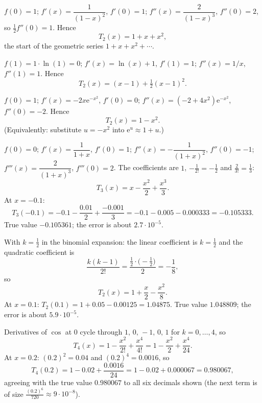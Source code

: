 \begin{solutions}
  \item $f(0)=1$; $f'(x)=\dfrac{1}{(1-x)^{2}}$, $f'(0)=1$;
        $f''(x)=\dfrac{2}{(1-x)^{3}}$, $f''(0)=2$, so
        $\tfrac12 f''(0)=1$. Hence
        \[
          T_{2}(x)=1+x+x^{2} ,
        \]
        the start of the geometric series $1+x+x^{2}+\cdots$.

  \item $f(1)=1\cdot\ln(1)=0$; $f'(x)=\ln(x)+1$, $f'(1)=1$;
        $f''(x)=1/x$, $f''(1)=1$. Hence
        \[
          T_{2}(x)=(x-1)+\tfrac12(x-1)^{2} .
        \]

  \item $f(0)=1$; $f'(x)=-2x\mathrm{e}^{-x^{2}}$, $f'(0)=0$;
        $f''(x)=(-2+4x^{2})\mathrm{e}^{-x^{2}}$, $f''(0)=-2$. Hence
        \[
          T_{2}(x)=1-x^{2} .
        \]
        (Equivalently: substitute $u=-x^{2}$ into
        $\mathrm{e}^{u}\approx 1+u$.)

  \item $f(0)=0$; $f'(x)=\dfrac{1}{1+x}$, $f'(0)=1$;
        $f''(x)=-\dfrac{1}{(1+x)^{2}}$, $f''(0)=-1$;
        $f'''(x)=\dfrac{2}{(1+x)^{3}}$, $f'''(0)=2$. The coefficients
        are $1$, $-\tfrac{1}{2!}=-\tfrac12$ and
        $\tfrac{2}{3!}=\tfrac13$:
        \[
          T_{3}(x)=x-\frac{x^{2}}{2}+\frac{x^{3}}{3} .
        \]
        At $x=-0.1$:
        \[
          T_{3}(-0.1)=-0.1-\frac{0.01}{2}+\frac{-0.001}{3}
                     =-0.1-0.005-0.000333=-0.105333 .
        \]
        True value $-0.105361$; the error is about $2.7\cdot 10^{-5}$.

  \item With $k=\tfrac12$ in the binomial expansion: the linear
        coefficient is $k=\tfrac12$ and the quadratic coefficient is
        \[
          \frac{k(k-1)}{2!}
            =\frac{\tfrac12\cdot\bigl(-\tfrac12\bigr)}{2}
            =-\frac18 ,
        \]
        so
        \[
          T_{2}(x)=1+\frac{x}{2}-\frac{x^{2}}{8} .
        \]
        At $x=0.1$: $T_{2}(0.1)=1+0.05-0.00125=1.04875$. True value
        $1.048809$; the error is about $5.9\cdot 10^{-5}$.

  \item Derivatives of $\cos$ at $0$ cycle through
        $1,\,0,\,-1,\,0,\,1$ for $k=0,\ldots,4$, so
        \[
          T_{4}(x)=1-\frac{x^{2}}{2!}+\frac{x^{4}}{4!}
                  =1-\frac{x^{2}}{2}+\frac{x^{4}}{24} .
        \]
        At $x=0.2$: $(0.2)^{2}=0.04$ and $(0.2)^{4}=0.0016$, so
        \[
          T_{4}(0.2)=1-0.02+\frac{0.0016}{24}
                    =1-0.02+0.000067=0.980067 ,
        \]
        agreeing with the true value $0.980067$ to all six decimals
        shown (the next term is of size $\tfrac{(0.2)^{6}}{720}\approx
        9\cdot 10^{-8}$).


\end{solutions}

